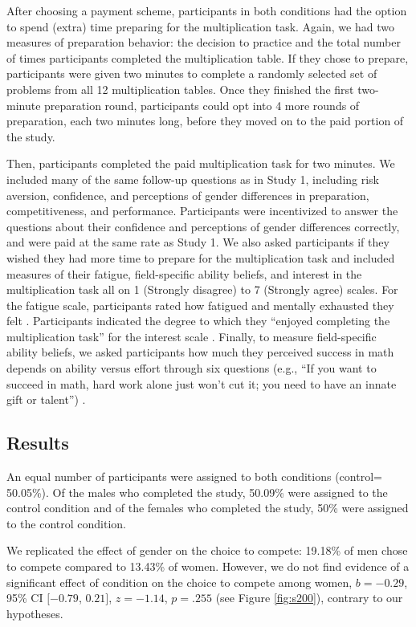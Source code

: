 \documentclass[a4paper, nobind]{templates/ociamthesis}
\begin{document}
After choosing a payment scheme, participants in both conditions had the option to spend (extra) time preparing for the multiplication task. Again, we had two measures of preparation behavior: the decision to practice and the total number of times participants completed the multiplication table. If they chose to prepare, participants were given two minutes to complete a randomly selected set of problems from all 12 multiplication tables. Once they finished the first two-minute preparation round, participants could opt into 4 more rounds of preparation, each two minutes long, before they moved on to the paid portion of the study.

Then, participants completed the paid multiplication task for two minutes. We included many of the same follow-up questions as in Study 1, including risk aversion, confidence, and perceptions of gender differences in preparation, competitiveness, and performance. Participants were incentivized to answer the questions about their confidence and perceptions of gender differences correctly, and were paid at the same rate as Study 1. We also asked participants if they wished they had more time to prepare for the multiplication task and included measures of their fatigue, field-specific ability beliefs, and interest in the multiplication task all on 1 (Strongly disagree) to 7 (Strongly agree) scales. For the fatigue scale, participants rated how fatigued and mentally exhausted they felt \autocite{Milyavskaya2018}. Participants indicated the degree to which they ``enjoyed completing the multiplication task'' for the interest scale \autocite{Milyavskaya2018}. Finally, to measure field-specific ability beliefs, we asked participants how much they perceived success in math depends on ability versus effort through six questions (e.g., ``If you want to succeed in math, hard work alone just won't cut it; you need to have an innate gift or talent'') \autocite{Meyer2015}.

\hypertarget{results-1}{%
\subsection{Results}\label{results-1}}

An equal number of participants were assigned to both conditions (control= 50.05\%). Of the males who completed the study, 50.09\% were assigned to the control condition and of the females who completed the study, 50\% were assigned to the control condition.

We replicated the effect of gender on the choice to compete: 19.18\% of men chose to compete compared to 13.43\% of women. However, we do not find evidence of a significant effect of condition on the choice to compete among women, \(b = -0.29\), 95\% CI \([-0.79\), \(0.21]\), \(z = -1.14\), \(p = .255\) (see Figure \ref{fig:s200}), contrary to our hypotheses.
\end{document}
